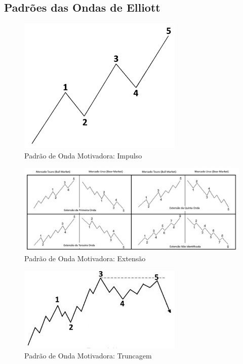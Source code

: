 \documentclass[12pt]{article}
\begin{document}
\subsection{Padrões das Ondas de Elliott} \label{app:EWPatterns}

\begin{figure}[H]
	\centering
	\includegraphics[width=0.7\textwidth]{EW_pattern_01.png}
	\caption{Padrão de Onda Motivadora: Impulso}\label{fig:EW_pattern_01}
\end{figure}

\begin{figure}[H]
	\centering
	\includegraphics[width=\textwidth]{EW_pattern_02.png}
	\caption{Padrão de Onda Motivadora: Extensão}\label{fig:EW_pattern_02}
\end{figure}

\begin{figure}[H]
	\centering
	\includegraphics[width=0.7\textwidth]{EW_pattern_03.png}
	\caption{Padrão de Onda Motivadora: Truncagem}\label{fig:EW_pattern_03}
\end{figure}
\end{document}
